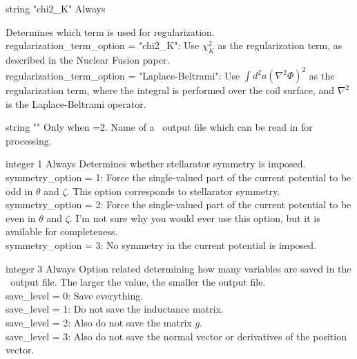 \myhrule

{string}
{{\ttfamily "chi2\_K"}}
{Always}
{Determines which term is used for regularization.\\

{\ttfamily regularization\_term\_option = "chi2\_K"}: Use $\chi^2_K$ as the regularization term, as described in the Nuclear Fusion paper.\\

{\ttfamily regularization\_term\_option = "Laplace-Beltrami"}: Use $\int d^2a (\nabla^2 \Phi)^2$ as the regularization term, where the integral is 
performed over the coil surface, and $\nabla^2$ is the Laplace-Beltrami operator.

}

\myhrule

{string}
{{\ttfamily ""}}
{Only when =2.}
{Name of a \nescoil~output file which can be read in for processing.
}

\myhrule

{integer}
{1}
{Always}
{Determines whether stellarator symmetry is imposed.\\

{\ttfamily symmetry\_option} = 1: Force the single-valued part of the current potential
to be odd in $\theta$ and $\zeta$. This option corresponds to stellarator symmetry.\\

{\ttfamily symmetry\_option} = 2: Force the single-valued part of the current potential
to be even in $\theta$ and $\zeta$. I'm not sure why you would ever use this option,
but it is available for completeness.\\

{\ttfamily symmetry\_option} = 3: No symmetry in the current potential is imposed.
}

\myhrule

{integer}
{3}
{Always}
{Option related determining how many variables are saved in the \netCDF~output file.  The larger the value, the smaller the output file.\\

{\ttfamily save\_level} = 0: Save everything.\\

{\ttfamily save\_level} = 1: Do not save the inductance matrix.\\

{\ttfamily save\_level} = 2: Also do not save the matrix $g$.\\

{\ttfamily save\_level} = 3: Also do not save the normal vector or derivatives of the position vector.
}

